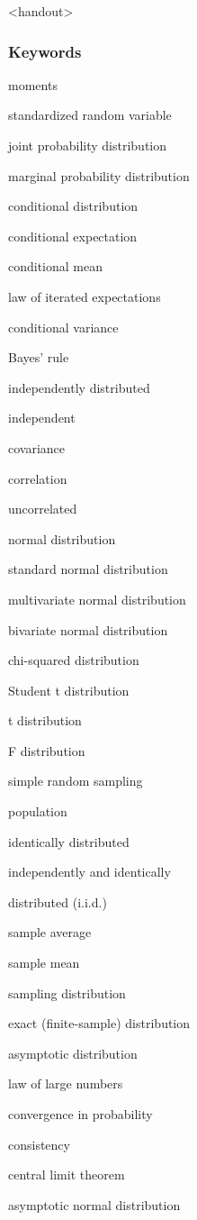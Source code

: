 

\begin{frame}<handout>
\frametitle{Keywords}
\begin{iteminline}
\item moments
\item standardized random variable
\item joint probability distribution
\item marginal probability distribution
\item conditional distribution
\item conditional expectation
\item conditional mean
\item law of iterated expectations
\item conditional variance
\item Bayes' rule
\item independently distributed
\item independent
\item covariance
\item correlation
\item uncorrelated
\item normal distribution
\item standard normal distribution
\item multivariate normal distribution
\item bivariate normal distribution
\item chi-squared distribution
\item Student t distribution
\item t distribution
\item F distribution
\item simple random sampling
\item population
\item identically distributed
\item independently and identically
\item distributed (i.i.d.)
\item sample average
\item sample mean
\item sampling distribution
\item exact (finite-sample) distribution
\item asymptotic distribution
\item law of large numbers
\item convergence in probability
\item consistency
\item central limit theorem
\item asymptotic normal distribution
\end{iteminline}
\end{frame}


